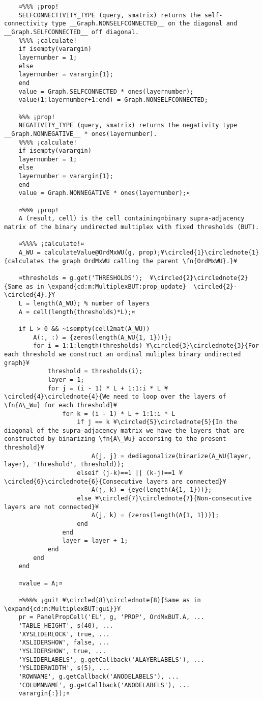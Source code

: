 \documentclass{tufte-handout}
\begin{document}
\begin{lstlisting}
	¤%%% ¡prop!
	SELFCONNECTIVITY_TYPE (query, smatrix) returns the self-connectivity type __Graph.NONSELFCONNECTED__ on the diagonal and __Graph.SELFCONNECTED__ off diagonal.
	%%%% ¡calculate!
	if isempty(varargin)
	layernumber = 1;
	else
	layernumber = varargin{1};
	end
	value = Graph.SELFCONNECTED * ones(layernumber);
	value(1:layernumber+1:end) = Graph.NONSELFCONNECTED;                
	
	%%% ¡prop!
	NEGATIVITY_TYPE (query, smatrix) returns the negativity type __Graph.NONNEGATIVE__ * ones(layernumber).
	%%%% ¡calculate!
	if isempty(varargin)
	layernumber = 1;
	else
	layernumber = varargin{1};
	end
	value = Graph.NONNEGATIVE * ones(layernumber);¤
	
	¤%%% ¡prop!
	A (result, cell) is the cell containing¤binary supra-adjacency matrix of the binary undirected multiplex with fixed thresholds (BUT).
	
	¤%%%% ¡calculate!¤
	A_WU = calculateValue@OrdMxWU(g, prop);¥\circled{1}\circlednote{1}{calculates the graph OrdMxWU calling the parent \fn{OrdMxWU}.}¥
	
	¤thresholds = g.get('THRESHOLDS');  ¥\circled{2}\circlednote{2}{Same as in \expand{cd:m:MultiplexBUT:prop_update}  \circled{2}-\circled{4}.}¥
	L = length(A_WU); % number of layers 
	A = cell(length(thresholds)*L);¤
	
	if L > 0 && ~isempty(cell2mat(A_WU))
		A(:, :) = {zeros(length(A_WU{1, 1}))};
		for i = 1:1:length(thresholds) ¥\circled{3}\circlednote{3}{For each threshold we construct an ordinal muliplex binary undirected graph}¥
			threshold = thresholds(i);
			layer = 1;
			for j = (i - 1) * L + 1:1:i * L ¥\circled{4}\circlednote{4}{We need to loop over the layers of \fn{A\_Wu} for each threshold}¥
				for k = (i - 1) * L + 1:1:i * L
					if j == k ¥\circled{5}\circlednote{5}{In the diagonal of the supra-adjacency matrix we have the layers that are constructed by binarizing \fn{A\_Wu} accorsing to the present threshold}¥
						A{j, j} = dediagonalize(binarize(A_WU{layer, layer}, 'threshold', threshold));
					elseif (j-k)==1 || (k-j)==1 ¥\circled{6}\circlednote{6}{Consecutive layers are connected}¥
						A(j, k) = {eye(length(A{1, 1}))};
					else ¥\circled{7}\circlednote{7}{Non-consecutive layers are not connected}¥
						A(j, k) = {zeros(length(A{1, 1}))};
					end
				end
				layer = layer + 1;
			end
		end
	end
	
	¤value = A;¤
	
	¤%%%% ¡gui! ¥\circled{8}\circlednote{8}{Same as in \expand{cd:m:MultiplexBUT:gui}}¥
	pr = PanelPropCell('EL', g, 'PROP', OrdMxBUT.A, ...
	'TABLE_HEIGHT', s(40), ...
	'XYSLIDERLOCK', true, ... 
	'XSLIDERSHOW', false, ...
	'YSLIDERSHOW', true, ...
	'YSLIDERLABELS', g.getCallback('ALAYERLABELS'), ...
	'YSLIDERWIDTH', s(5), ...
	'ROWNAME', g.getCallback('ANODELABELS'), ...
	'COLUMNNAME', g.getCallback('ANODELABELS'), ...
	varargin{:});¤
	

\end{lstlisting}
\end{document}

